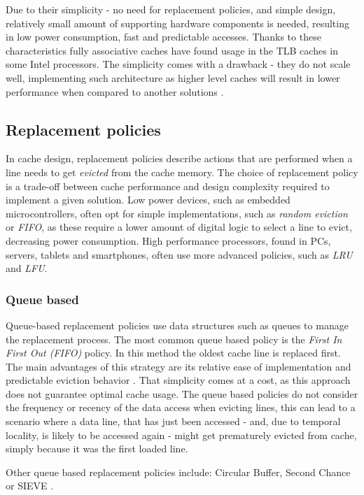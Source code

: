 \noindent Due to their simplicity - no need for replacement policies, and simple design, relatively small amount of supporting hardware components is needed, resulting in low power
consumption, fast and predictable accesses. Thanks to these characteristics fully associative caches have found usage in the TLB caches in some Intel processors. The simplicity
comes with a drawback - they do not scale well, implementing such architecture as higher level caches will result in lower performance when compared to another solutions \cite{whatevery}.

\subsection{Replacement policies} \label{sec:eviction_policies}
In cache design, replacement policies describe actions that are performed when a line needs to get \textit{evicted} from the cache memory.
The choice of replacement policy is a trade-off between cache performance and design complexity required to implement a given solution. Low power
devices, such as embedded microcontrollers, often opt for simple implementations, such as \textit{random eviction} or \textit{FIFO}, as these require
a lower amount of digital logic to select a line to evict, decreasing power consumption. High performance processors, found in PCs, servers, tablets and smartphones,
often use more advanced policies, such as \textit{LRU} and \textit{LFU}.

\subsubsection{Queue based}
Queue-based replacement policies use data structures such as queues to manage the replacement process. The most common queue based policy is the
\textit{First In First Out (FIFO)} policy. In this method the oldest cache line is replaced first. The main advantages of this strategy are
its relative ease of implementation and predictable eviction behavior \cite{fifo1}. That simplicity comes at a cost, as this approach does not guarantee optimal cache usage. The queue
based policies do not consider the frequency or recency of the data access when evicting lines, this can lead to a scenario where a data line, that has just been accessed - and, due to
temporal locality, is likely to be accessed again - might get prematurely evicted from cache, simply because it was the first loaded line.

\vspace{10px}\noindent Other queue based replacement policies include: Circular Buffer, Second Chance or SIEVE \cite{fifo2}.

